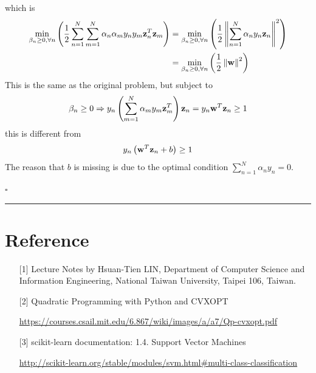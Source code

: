 \documentclass[12pt]{article}
\newcommand*{\QEDB}{\hfill\ensuremath{\square}}
\newcommand{\ParTh}[1]{\left(#1\right)}
\newcommand{\BF}[1]{{\bf#1}}
\newcommand{\VecAbsVal}[1]{\left\|#1\right\|}
\newcommand{\horrule}[1]{\rule{\linewidth}{#1}}
\begin{document}
which is
\begin{align}
\min_{\beta_n\geq0,\forall n}\ParTh{\dfrac{1}{2}\sum_{n=1}^{N}\sum_{m=1}^{N}\alpha_n\alpha_my_ny_m\BF{z}^T_n\BF{z}_m}&=\min_{\beta_n\geq0,\forall n}\ParTh{\dfrac{1}{2}\VecAbsVal{\sum_{n=1}^{N}\alpha_ny_n\BF{z}_n}^2}\\
&=\min_{\beta_n\geq0,\forall n}\ParTh{\dfrac{1}{2}\VecAbsVal{\BF{w}}^2}
\end{align}
This is the same as the original problem, but subject to
\begin{align}
\beta_n\geq0\Rightarrow y_n\ParTh{\sum_{m=1}^{N}\alpha_my_m\BF{z}^T_m}\BF{z}_n=y_n\BF{w}^T\BF{z}_n\geq1
\end{align}
this is different from
\begin{align}
y_n\ParTh{\BF{w}^T\BF{z}_n+b}\geq1
\end{align}
The reason that $b$ is missing is due to the optimal condition $\sum_{n=1}^{N}\alpha_ny_n=0$.

\QEDB

\horrule{0.5pt}

\section*{Reference}

\begin{enumerate}

\item[{[1]}] Lecture Notes by Hsuan-Tien LIN, Department of Computer Science and Information Engineering, National Taiwan University, Taipei 106, Taiwan.

\item[{[2]}] Quadratic Programming with Python and CVXOPT

\url{https://courses.csail.mit.edu/6.867/wiki/images/a/a7/Qp-cvxopt.pdf}

\item[{[3]}] scikit-learn documentation: 1.4. Support Vector Machines

\url{http://scikit-learn.org/stable/modules/svm.html#multi-class-classification}

\end{enumerate}
\end{document}
